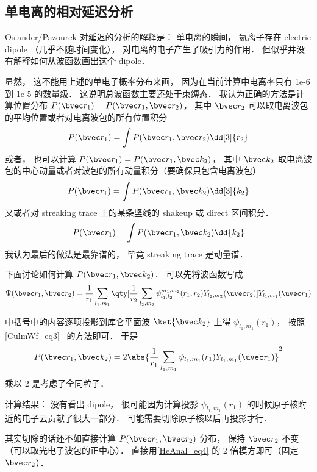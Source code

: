 \subsection{单电离的相对延迟分析}

Osiander/Pazourek 对延迟的分析的解释是： 单电离的瞬间， 氦离子存在 electric dipole （几乎不随时间变化）， 对电离的电子产生了吸引力的作用． 但似乎并没有解释如何从波函数画出这个 dipole．

显然， 这不能用上述的单电子概率分布来画， 因为在当前计算中电离率只有 1e-6 到 1e-5 的数量级． 这说明总波函数主要还处于束缚态． 我认为正确的方法是计算位置分布 $P(\bvec r_1) = P(\bvec r_1, \bvec r_2)$， 其中 $\bvec r_2$ 可以取电离波包的平均位置或者对电离波包的所有位置积分
\begin{equation}
P(\bvec r_1) = \int P(\bvec r_1, \bvec r_2) \dd[3]{r_2}
\end{equation}
或者， 也可以计算 $P(\bvec r_1) = P(\bvec r_1, \bvec k_2)$， 其中 $\bvec k_2$ 取电离波包的中心动量或者对波包的所有动量积分（要确保只包含电离波包）
\begin{equation}
P(\bvec r_1) = \int P(\bvec r_1, \bvec k_2) \dd[3]{k_2}
\end{equation}
又或者对 streaking trace 上的某条竖线的 shakeup 或 direct 区间积分．
\begin{equation}
P(\bvec r_1) = \int P(\bvec r_1, \bvec k_2) \dd{k_2}
\end{equation}
我认为最后的做法是最靠谱的， 毕竟 streaking trace 是动量谱．

下面讨论如何计算 $P(\bvec r_1, \bvec k_2)$． 可以先将波函数写成
\begin{equation}\label{HeAnal_eq4}
\Psi(\bvec r_1, \bvec r_2) = \frac{1}{r_1}\sum_{l_1,m_1} \qty[\frac{1}{r_2}\sum_{l_2,m_2} \psi_{l_1,l_2}^{m_1,m_2}(r_1, r_2) Y_{l_2,m_2}(\uvec r_2)] Y_{l_1,m_1}(\uvec r_1)
\end{equation}

中括号中的内容逐项投影到库仑平面波 $\ket{\bvec k_2}$ 上得 $\psi_{l_1,m_1}(r_1)$， 按照\autoref{CulmWf_eq3}~ 的方法即可． 于是
\begin{equation}\label{HeAnal_eq1}
P(\bvec r_1, \bvec k_2) = 2\abs{\frac{1}{r_1}\sum_{l_1,m_1} \psi_{l_1,m_1}(r_1) Y_{l_1,m_1}(\uvec r_1)}^2
\end{equation}
乘以 2 是考虑了全同粒子．

计算结果： 没有看出 dipole， 很可能因为计算投影 $\psi_{l_1,m_1}(r_1)$ 的时候原子核附近的电子云贡献了很大一部分． 可能需要切除原子核以后再投影才行．

其实切除的话还不如直接计算 $P(\bvec r_1, \bvec r_2)$ 分布， 保持 $\bvec r_2$ 不变（可以取光电子波包的正中心）． 直接用\autoref{HeAnal_eq4} 的 2 倍模方即可（固定 $\bvec r_2$）．

